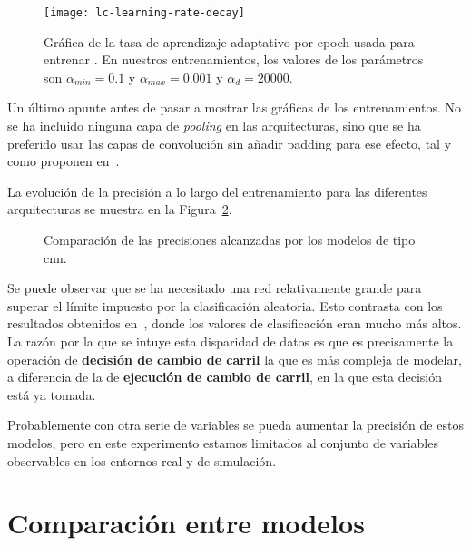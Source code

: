 \begin{figure}
	\centering
	\texttt{[image: lc-learning-rate-decay]}
	\caption[Gráfica de la tasa de aprendizaje adaptativo por \textit{epoch} usada para entrenar ]{Gráfica de la tasa de aprendizaje adaptativo por epoch usada para entrenar . En nuestros entrenamientos, los valores de los parámetros son $\alpha_{min} = 0.1$ y $\alpha_{max} = 0.001$ y $\alpha_d = 20000$.}
	\label{fig:learning-rate-decay}
\end{figure}

Un último apunte antes de pasar a mostrar las gráficas de los entrenamientos. No se ha incluido ninguna capa de \textit{pooling} en las arquitecturas, sino que se ha preferido usar las capas de convolución sin añadir padding para ese efecto, tal y como proponen en~\cite{howard2017mobilenets}.

La evolución de la precisión a lo largo del entrenamiento para las diferentes arquitecturas se muestra en la Figura~\ref{fig:lc-cnn-training-validation-test-comparison}.

\begin{figure}
	\centering
	\qquad
	\caption[Comparación de las precisiones alcanzadas por los modelos de tipo ]{Comparación de las precisiones alcanzadas por los modelos de tipo \acrshort{cnn}.}
	\label{fig:lc-cnn-training-validation-test-comparison}
\end{figure}

Se puede observar que se ha necesitado una red relativamente grande para superar el límite impuesto por la clasificación aleatoria. Esto contrasta con los resultados obtenidos en~\cite{diaz2018modelling}, donde los valores de clasificación eran mucho más altos. La razón por la que se intuye esta disparidad de datos es que es precisamente la operación de \textbf{decisión de cambio de carril} la que es más compleja de modelar, a diferencia de la de \textbf{ejecución de cambio de carril}, en la que esta decisión está ya tomada.

Probablemente con otra serie de variables se pueda aumentar la precisión de estos modelos, pero en este experimento estamos limitados al conjunto de variables observables en los entornos real y de simulación.

\section{Comparación entre modelos}

